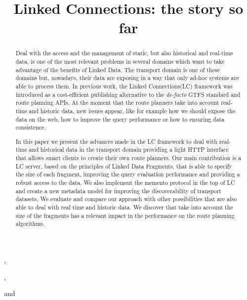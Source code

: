 \documentclass[sw]{iosart2x}
\begin{document}
\begin{frontmatter}

\title{Linked Connections: the story so far} 


\author[A]{ },
\author[B]{ },
\author[B]{ }
and
\author[A]{ }
\address[A]{Ontology Engineering Group, , }
\address[B]{IDLab, Department of Electronics and Information Systems, , 
}


\begin{abstract}
Deal with the access and the management of static, but also historical and real-time data, is one of the most relevant problems in several domains which want to take advantage of the benefits of Linked Data. The transport domain is one of these domains but, nowadays, their data are exposing in a way that only ad-hoc systems are able to process them. In previous work, the Linked Connections(LC) framework was introduced as a cost-efficient publishing alternative to the \textit{de-facto} GTFS standard and route planning APIs. At the moment that the route planners take into account real-time and historic data, new issues appear, like for example how we should expose the data on the web, how to improve the query performance or how to ensuring data consistence.

In this paper we present the advances made in the LC framework to deal with real-time and historical data in the transport domain providing a light HTTP interface that allows smart clients to create their own route planners. Our main contribution is a LC server, based on the principles of Linked Data Fragments, that is able to specify the size of each fragment, improving the query evaluation performance and providing a robust access to the data. We also implement the memento protocol in the top of LC and create a new metadata model for improving the discoverability of transport datasets. We evaluate and compare our approach with other possibilities that are also able to deal with real time and historic data. We discover that take into account the size of the fragments has a relevant impact in the performance on the route planning algorithms.   


\end{abstract}
\end{frontmatter}
\end{document}

